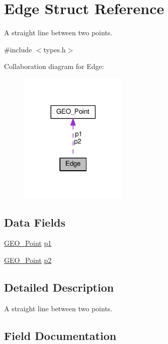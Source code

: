 \hypertarget{struct_edge}{}\section{Edge Struct Reference}
\label{struct_edge}


A straight line between two points.  




{\ttfamily \#include $<$types.\+h$>$}



Collaboration diagram for Edge\+:\nopagebreak
\begin{figure}[H]
\begin{center}
\leavevmode
\includegraphics[width=146pt]{struct_edge__coll__graph}
\end{center}
\end{figure}
\subsection*{Data Fields}
\begin{DoxyCompactItemize}
\item 
\hyperlink{struct_g_e_o___point}{G\+E\+O\+\_\+\+Point} \hyperlink{struct_edge_aece77b6cba572ad1536ef0f6ce20cb82}{p1}
\item 
\hyperlink{struct_g_e_o___point}{G\+E\+O\+\_\+\+Point} \hyperlink{struct_edge_a51a95439187066c7cc5f32a60cdef5a6}{p2}
\end{DoxyCompactItemize}


\subsection{Detailed Description}
A straight line between two points. 

\subsection{Field Documentation}
